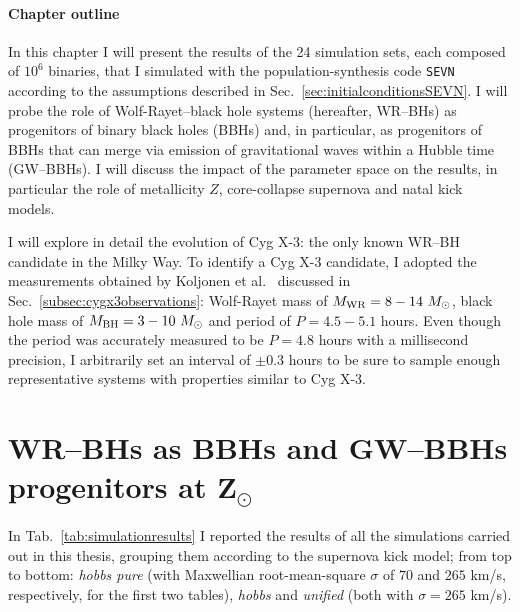 \documentclass[a4paper,titlepage]{book}     	%
\newcommand{\sun}{\ensuremath{_\odot}}
\newcommand{\msun}{\ensuremath{M\sun}}
\begin{document}
\paragraph{Chapter outline} In this chapter I will present the results of the 24 simulation sets, each composed of $10^6$ binaries, that I simulated with the population-synthesis code \texttt{SEVN} according to the assumptions described in Sec.\ \ref{sec:initialconditionsSEVN}. I will probe the role of Wolf-Rayet--black hole systems (hereafter, WR--BHs) as progenitors of binary black holes (BBHs) and, in particular, as progenitors of BBHs that can merge via emission of gravitational waves within a Hubble time (GW--BBHs). I will discuss the impact of the parameter space on the results, in particular the role of metallicity $Z$, core-collapse supernova and natal kick models. 

I will explore in detail the evolution of Cyg X-3: the only known WR--BH candidate in the Milky Way. To identify a Cyg X-3 candidate, I adopted the measurements obtained  by Koljonen et al.\ \cite{CygX-3_Koljonen2017} discussed in Sec.\ \ref{subsec:cygx3observations}: Wolf-Rayet mass of $M_{\rm WR} = 8-14~\msun$, black hole mass of $M_{\rm BH}=3-10~\msun$ and period of $P=4.5-5.1$ hours. Even though the period was accurately measured to be $P=4.8$ hours with a millisecond precision, I arbitrarily set an interval of $\pm 0.3$ hours to be sure to sample enough representative systems with properties similar to Cyg X-3.




\section{WR--BHs as BBHs and GW--BBHs progenitors at $\mathbf{Z_\odot}$} \label{sec:roleWRBH}


In Tab.\ \ref{tab:simulationresults} I reported the results of all the simulations carried out in this thesis, grouping them according to the supernova kick model; from top to bottom: \emph{hobbs pure} (with Maxwellian root-mean-square $\sigma$ of $70$ and $265$ km/s, respectively, for the first two tables), \emph{hobbs} and \emph{unified} (both with $\sigma=265$ km/s).
\end{document}
